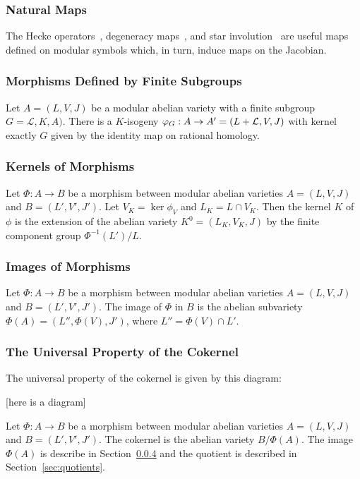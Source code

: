 \documentclass{article}
\begin{document}
\subsubsection{Natural Maps}
\label{sec:natural_maps}
The Hecke operators~\cite[\S 8.3]{stein:modform}, degeneracy maps~\cite[\S
8.6]{stein:modform}, and star involution~\cite[\S 8.5]{stein:modform} are
useful maps defined on modular symbols which, in turn, induce maps on the
Jacobian.

\subsubsection{Morphisms Defined by Finite Subgroups}

Let $A=(L, V, J)$ be a modular abelian variety with a finite subgroup
$G=\mathcal{L}, K, A)$. There is a $K$-isogeny $\varphi_G: A\to
A'=(L+\mathcal{L}, V, J)$ with kernel exactly $G$ given by the identity map on
rational homology.

\subsubsection{Kernels of Morphisms}
\label{sec:kernelmodabvar}

Let $\Phi:A\to B$ be a morphism between modular abelian varieties $A=(L, V, J)$
and $B=(L', V', J')$. Let $V_K=\ker \phi_V$ and $L_K=L\cap V_K$. Then the
kernel $K$ of $\phi$ is the extension of the abelian variety $K^0 = (L_K, V_K,
J)$ by the finite component group $\Phi^{-1}(L')/L$.

\subsubsection{Images of Morphisms}
\label{sec:image}

Let $\Phi:A\to B$ be a morphism between modular abelian varieties $A=(L, V, J)$
and $B=(L', V', J')$. The image of $\Phi$ in $B$ is the abelian subvariety
$\Phi(A)=(L'', \Phi(V), J')$, where $L''=\Phi(V)\cap L'$.


\subsubsection{The Universal Property of the Cokernel}

The universal property of the cokernel is given by this diagram:

[here is a diagram]

Let $\Phi:A\to B$ be a morphism between modular abelian varieties $A=(L, V, J)$
and $B=(L', V', J')$. The cokernel is the abelian variety $B/\Phi(A)$. The
image $\Phi(A)$ is describe in Section~\ref{sec:image} and the quotient is
described in Section~\ref{sec:quotients}.
\end{document}
